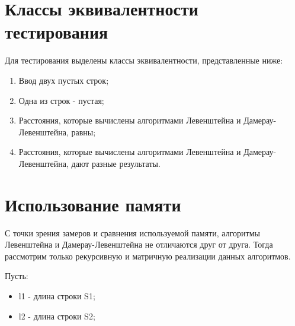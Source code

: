\clearpage

\section{Классы эквивалентности тестирования}

Для тестирования выделены классы эквивалентности, представленные ниже:

\begin{enumerate}
	\item Ввод двух пустых строк;
	\item Одна из строк - пустая;
	\item Расстояния, которые вычислены алгоритмами Левенштейна и Дамерау-Левенштейна, равны;
	\item Расстояния, которые вычислены алгоритмами Левенштейна и Дамерау-Левенштейна, дают разные результаты.
\end{enumerate}

\section{Использование памяти}

С точки зрения замеров и сравнения используемой памяти, алгоритмы Левенштейна и Дамерау-Левенштейна не отличаются друг от друга.
Тогда рассмотрим только рекурсивную и матричную реализации данных алгоритмов.

Пусть:
\begin{itemize}
	\item l1 - длина строки S1;
	\item l2 - длина строки S2;
\end{itemize}

